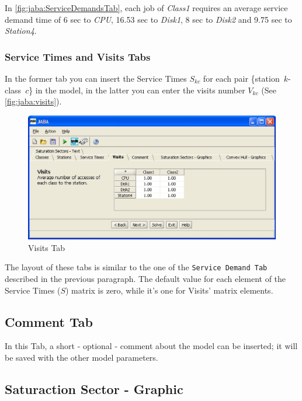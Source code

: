 In \autoref{fig:jaba:ServiceDemandsTab}, each job of \emph{Class1} requires an average service demand time of 6
sec to \emph{CPU}, 16.53 sec to \emph{Disk1}, 8 sec to
\emph{Disk2} and 9.75 sec to \emph{Station4}.\\

\subsubsection{Service Times and Visits Tabs}
In the former tab you can insert the Service Times $S_{kc}$ for each
pair \{station~$k$-class~$c$\} in the model, in the latter you can
enter the visits number $V_{kc}$ (See \autoref{fig:jaba:visits}).
\begin{figure}[htbp]
    \begin{center}
        \includegraphics[scale=.5]{img/jaba/visits}
    \end{center}
    \caption{Visits Tab}
    \label{fig:jaba:visits}
\end{figure}

The layout of these tabs is similar to the one of the
\texttt{Service Demand Tab} described in the previous paragraph. The
default value for each element of the Service Times ($S$) matrix is
zero, while it's one for Visits' matrix elements.


\subsection{Comment Tab}
In this Tab, a short - optional - comment about the model can be
inserted; it will be saved with the other model parameters.


\subsection{Saturaction Sector - Graphic}
\label{sec:jaba:saturationSectorGraphic}


